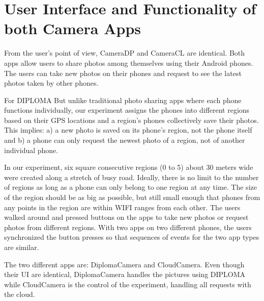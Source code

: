 \chapter{User Interface and Functionality of both Camera Apps}

From the user's point of view, CameraDP and CameraCL are identical. Both apps allow users to share photos among themselves using their Android phones.  The users can take new photos on their phones and request to see the latest photos taken by other phones. 

For DIPLOMA But unlike traditional photo sharing apps where each phone functions individually, our experiment assigns the phones into different regions based on their GPS locations and a region’s phones collectively save their photos.  This implies: a) a new photo is saved on its phone’s region, not the phone itself and b) a phone can only request the newest photo of a region, not of another individual phone. 
 
In our experiment, six square consecutive regions (0 to 5) about 30 meters wide were created along a stretch of busy road.  Ideally, there is no limit to the number of regions as long as a phone can only belong to one region at any time. The size of the region should be as big as possible, but still small enough that phones from any points in the region are within WIFI ranges from each other. The users walked around and pressed buttons on the apps to take new photos or request photos from different regions. With two apps on two different phones, the users synchronized the button presses so that sequences of events for the two app types are similar.

The two different apps are: DiplomaCamera and CloudCamera. Even though their UI are identical, DiplomaCamera handles the pictures using DIPLOMA while CloudCamera is the control of the experiment, handling all requests with the cloud.

